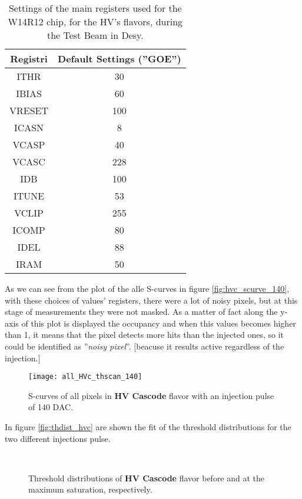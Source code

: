 \begin{table}[h!]
\centering
\begin{tabular}{c|c}
Registri & Default Settings (''GOE'') \\
\hline
ITHR & 30 \\
\hline
IBIAS & 60 \\
\hline
VRESET & 100 \\
\hline
ICASN & 8 \\
\hline
VCASP & 40 \\
\hline
VCASC & 228 \\
\hline
IDB & 100 \\
\hline
ITUNE & 53 \\
\hline
VCLIP & 255 \\
\hline
ICOMP & 80 \\
\hline
IDEL & 88 \\
\hline
IRAM & 50 \\
\hline
\end{tabular}
\caption{Settings of the main registers used for the W14R12 chip, for the HV's flavors, during the Test Beam in Desy.}
\label{tab:tb_hv_settings}
\end{table}

As we can see from the plot of the alle S-curves in figure \vref{fig:hvc_scurve_140}, with these choices of values' registers, there were a lot of noisy pixels, but at this stage of measurements they were not masked.
As a matter of fact along the y-axis of this plot is displayed the occupancy and when this values becomes higher than 1, it means that the pixel detects more hits than the injected ones, so it could be identified as ''\textit{noisy pixel}''.
[beacuse it results active regardless of the injection.]


\begin{figure}[h!]
\centering
\texttt{[image: all\_HVc\_thscan\_140]}
\caption{S-curves of all pixels in \textbf{HV Cascode} flavor with an injection pulse of 140 DAC.}
\label{fig:hvc_scurve_140}
\end{figure}

In figure \vref{fig:thdist_hvc} are shown the fit of the threshold distributions for the two different injections pulse.

\begin{figure}[h!]
\centering
{}\quad
{}\\
\caption{Threshold distributions of \textbf{HV Cascode} flavor before and at the maximum saturation, respectively.}
\label{fig:thdist_hvc}
\end{figure}


